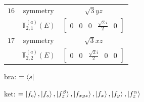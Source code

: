 \documentclass[fleqn,8pt,landscape]{jsarticle}
\begin{document}
\begin{longtable}{ccc}
$ 16 $ & $ \text{symmetry} $ & $ \sqrt{3} y z $ \\
$  $ & $ \mathbb{T}_{2,1}^{(a)}(E) $ & $ \begin{bmatrix} 0 & 0 & 0 & \frac{\sqrt{2} i}{2} & 0 \end{bmatrix} $ \\ \hline
$ 17 $ & $ \text{symmetry} $ & $ \sqrt{3} x z $ \\
$  $ & $ \mathbb{T}_{2,2}^{(a)}(E) $ & $ \begin{bmatrix} 0 & 0 & \frac{\sqrt{2} i}{2} & 0 & 0 \end{bmatrix} $ \\ \hline
\end{longtable}
bra: $=\bra{s}$

\noindent
ket: $=\ket{f_{c}}, \ket{f_{s}}, \ket{f_{z}^{\beta}}, \ket{f_{xyz}}, \ket{f_{x}}, \ket{f_{y}}, \ket{f_{z}^{\alpha}}$
\renewcommand{\arraystretch}{1.6}
\end{document}
